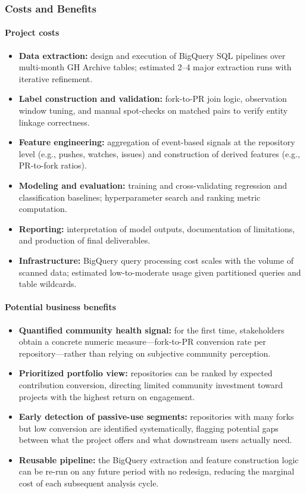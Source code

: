\subsubsection{Costs and Benefits}
\paragraph{Project costs}
\begin{itemize}
  \item \textbf{Data extraction:} design and execution of BigQuery SQL pipelines over multi-month GH Archive tables; estimated 2--4 major extraction runs with iterative refinement.
  \item \textbf{Label construction and validation:} fork-to-PR join logic, observation window tuning, and manual spot-checks on matched pairs to verify entity linkage correctness.
  \item \textbf{Feature engineering:} aggregation of event-based signals at the repository level (e.g., pushes, watches, issues) and construction of derived features (e.g., PR-to-fork ratios).
  \item \textbf{Modeling and evaluation:} training and cross-validating regression and classification baselines; hyperparameter search and ranking metric computation.
  \item \textbf{Reporting:} interpretation of model outputs, documentation of limitations, and production of final deliverables.
  \item \textbf{Infrastructure:} BigQuery query processing cost scales with the volume of scanned data; estimated low-to-moderate usage given partitioned queries and table wildcards.
\end{itemize}

\paragraph{Potential business benefits}
\begin{itemize}
  \item \textbf{Quantified community health signal:} for the first time, stakeholders obtain a concrete numeric measure---fork-to-PR conversion rate per repository---rather than relying on subjective community perception.
  \item \textbf{Prioritized portfolio view:} repositories can be ranked by expected contribution conversion, directing limited community investment toward projects with the highest return on engagement.
  \item \textbf{Early detection of passive-use segments:} repositories with many forks but low conversion are identified systematically, flagging potential gaps between what the project offers and what downstream users actually need.
  \item \textbf{Reusable pipeline:} the BigQuery extraction and feature construction logic can be re-run on any future period with no redesign, reducing the marginal cost of each subsequent analysis cycle.
\end{itemize}

